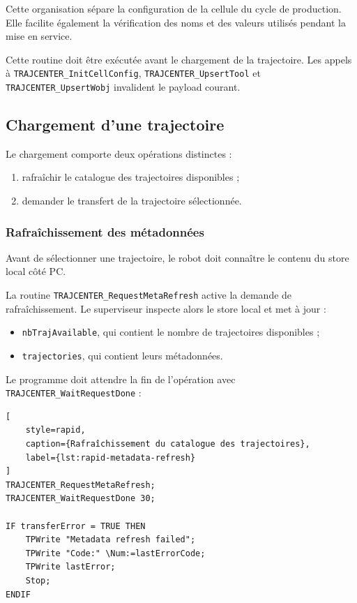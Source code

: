 \documentclass{rapportENSAM}
\begin{document}
Cette organisation sépare la configuration de la cellule du cycle de
production. Elle facilite également la vérification des noms et des valeurs
utilisés pendant la mise en service.

Cette routine doit être exécutée avant le chargement de la trajectoire. Les
appels à \texttt{TRAJCENTER\_InitCellConfig},
\texttt{TRAJCENTER\_UpsertTool} et
\texttt{TRAJCENTER\_UpsertWobj} invalident le payload courant.


\subsection{Chargement d'une trajectoire}
\label{subsec:rapid-trajectory-loading}

Le chargement comporte deux opérations distinctes :

\begin{enumerate}
    \item rafraîchir le catalogue des trajectoires disponibles ;
    \item demander le transfert de la trajectoire sélectionnée.
\end{enumerate}


\subsubsection{Rafraîchissement des métadonnées}
\label{subsubsec:rapid-metadata-refresh}

Avant de sélectionner une trajectoire, le robot doit connaître le contenu du
store local côté PC.

La routine \texttt{TRAJCENTER\_RequestMetaRefresh} active la demande de
rafraîchissement. Le superviseur inspecte alors le store local et met à jour :

\begin{itemize}
    \item \texttt{nbTrajAvailable}, qui contient le nombre de trajectoires
    disponibles ;
    \item \texttt{trajectories}, qui contient leurs métadonnées.
\end{itemize}

Le programme doit attendre la fin de l'opération avec
\texttt{TRAJCENTER\_WaitRequestDone} :

\begin{lstlisting}[
    style=rapid,
    caption={Rafraîchissement du catalogue des trajectoires},
    label={lst:rapid-metadata-refresh}
]
TRAJCENTER_RequestMetaRefresh;
TRAJCENTER_WaitRequestDone 30;

IF transferError = TRUE THEN
    TPWrite "Metadata refresh failed";
    TPWrite "Code:" \Num:=lastErrorCode;
    TPWrite lastError;
    Stop;
ENDIF
\end{lstlisting}
\end{document}
